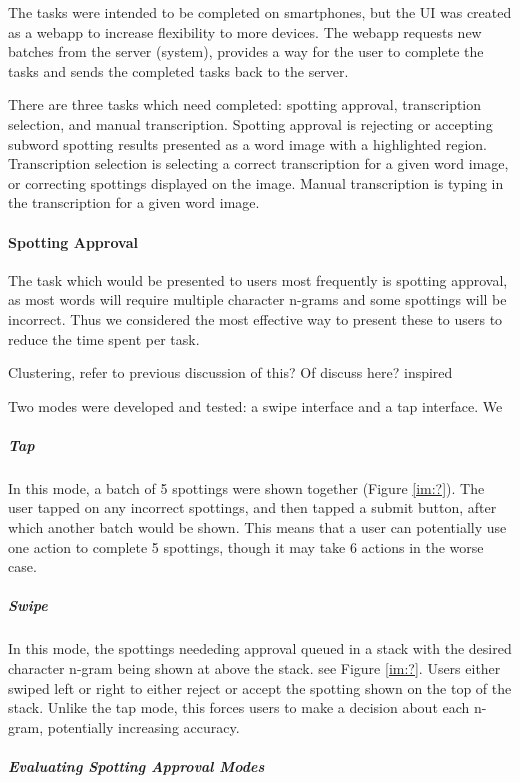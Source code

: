 \documentclass[ms,electronic,twosidetoc,letterpaper,chaptercenter,parttop,lol,lof,lot]{byumsphd}
\begin{document}
The tasks were intended to be completed on smartphones, but the UI was created as a webapp to increase flexibility to more devices. The webapp requests new batches from the server (system), provides a way for the user to complete the tasks and sends the completed tasks back to the server.

There are three tasks which need completed: spotting approval, transcription selection, and manual transcription. Spotting approval is rejecting or accepting subword spotting results presented as a word image with a highlighted region. Transcription selection is selecting a correct transcription for a given word image, or correcting spottings displayed on the image. Manual transcription is typing in the transcription for a given word image.

\paragraph{Spotting Approval}

The task which would be presented to users most frequently is spotting approval, as most words will require multiple character n-grams and some spottings will be incorrect. Thus we considered the most effective way to present these to users to reduce the time spent per task.

Clustering, refer to previous discussion of this? Of discuss here? \cite{Retsinas2015} inspired

\iffalse
Two modes were developed and tested: a swipe interface and a tap interface. We

\subparagraph{Tap}
In this mode, a batch of 5 spottings were shown together (Figure \ref{im:?}). The user tapped on any incorrect spottings, and then tapped a submit button, after which another batch would be shown. This means that a user can potentially use one action to complete 5 spottings, though it may take 6 actions in the worse case.

\subparagraph{Swipe}
In this mode, the spottings neededing approval queued in a stack with the desired character n-gram being shown at above the stack. see Figure \ref{im:?}. Users either swiped left or right to either reject or accept the spotting shown on the top of the stack. Unlike the tap mode, this forces users to make a decision about each n-gram, potentially increasing accuracy.


\subparagraph{Evaluating Spotting Approval Modes}
\end{document}
